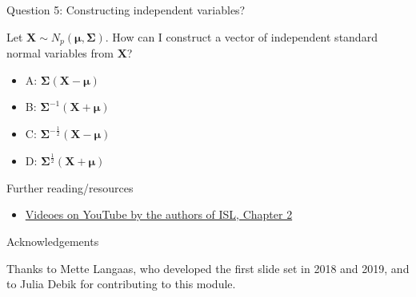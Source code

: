 \documentclass[ignorenonframetext,]{beamer}
\providecommand{\tightlist}{%
  \setlength{\itemsep}{0pt}\setlength{\parskip}{0pt}}
\begin{document}
\begin{frame}

\begin{block}{Question 5: Constructing independent variables?}

\vspace{2mm}

Let \(\boldsymbol{X}\sim N_p(\boldsymbol{\mu},\boldsymbol\Sigma)\). How
can I construct a vector of independent standard normal variables from
\(\boldsymbol{X}\)?

\vspace{2mm}

\begin{itemize}
\tightlist
\item
  A: \(\boldsymbol\Sigma(\boldsymbol{X}-\boldsymbol{\mu})\)
\item
  B: \(\boldsymbol\Sigma^{-1}(\boldsymbol{X}+\boldsymbol{\mu})\)
\item
  C:
  \(\boldsymbol\Sigma^{-\frac{1}{2}}(\boldsymbol{X}-\boldsymbol{\mu})\)
\item
  D:
  \(\boldsymbol\Sigma^{\frac{1}{2}}(\boldsymbol{X}+\boldsymbol{\mu})\)
\end{itemize}

\end{block}

\end{frame}

\begin{frame}

\end{frame}

\begin{frame}{ Further reading/resources}
\protect\hypertarget{further-readingresources}{}

\begin{itemize}
\tightlist
\item
  \href{https://www.youtube.com/playlist?list=PL5-da3qGB5IDvuFPNoSqheihPOQNJpzyy}{Videoes
  on YouTube by the authors of ISL, Chapter 2}
\end{itemize}

\end{frame}

\begin{frame}{Acknowledgements}
\protect\hypertarget{acknowledgements}{}

Thanks to Mette Langaas, who developed the first slide set in 2018 and
2019, and to Julia Debik for contributing to this module.

\end{frame}
\end{document}
